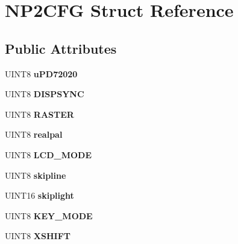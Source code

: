 \hypertarget{structNP2CFG}{\section{N\-P2\-C\-F\-G Struct Reference}
\label{structNP2CFG}
}
\subsection*{Public Attributes}
\begin{DoxyCompactItemize}
\item 
\hypertarget{structNP2CFG_afbc4660f716fc9b65a11ac7650f7a0f2}{U\-I\-N\-T8 {\bfseries u\-P\-D72020}}\label{structNP2CFG_afbc4660f716fc9b65a11ac7650f7a0f2}

\item 
\hypertarget{structNP2CFG_a37b2a0fa5e5775dc0e3ed127e1844c66}{U\-I\-N\-T8 {\bfseries D\-I\-S\-P\-S\-Y\-N\-C}}\label{structNP2CFG_a37b2a0fa5e5775dc0e3ed127e1844c66}

\item 
\hypertarget{structNP2CFG_a7633123ab7e14c1ff2b859aa9b92ce47}{U\-I\-N\-T8 {\bfseries R\-A\-S\-T\-E\-R}}\label{structNP2CFG_a7633123ab7e14c1ff2b859aa9b92ce47}

\item 
\hypertarget{structNP2CFG_aae2ceaeac33b5bed6f86b8de9e01f167}{U\-I\-N\-T8 {\bfseries realpal}}\label{structNP2CFG_aae2ceaeac33b5bed6f86b8de9e01f167}

\item 
\hypertarget{structNP2CFG_a3aac4d244e426320bb0688a49e750ebe}{U\-I\-N\-T8 {\bfseries L\-C\-D\-\_\-\-M\-O\-D\-E}}\label{structNP2CFG_a3aac4d244e426320bb0688a49e750ebe}

\item 
\hypertarget{structNP2CFG_af2d3df585466bcb8b6e2b4cfea0d4847}{U\-I\-N\-T8 {\bfseries skipline}}\label{structNP2CFG_af2d3df585466bcb8b6e2b4cfea0d4847}

\item 
\hypertarget{structNP2CFG_a2b2c188a36505b9f6364dd0047788469}{U\-I\-N\-T16 {\bfseries skiplight}}\label{structNP2CFG_a2b2c188a36505b9f6364dd0047788469}

\item 
\hypertarget{structNP2CFG_a8fb34dfc3f634912d2bd8664abaeeb7f}{U\-I\-N\-T8 {\bfseries K\-E\-Y\-\_\-\-M\-O\-D\-E}}\label{structNP2CFG_a8fb34dfc3f634912d2bd8664abaeeb7f}

\item 
\hypertarget{structNP2CFG_ac96dcb958d212595cd814ab9db2b94b3}{U\-I\-N\-T8 {\bfseries X\-S\-H\-I\-F\-T}}\label{structNP2CFG_ac96dcb958d212595cd814ab9db2b94b3}


\end{DoxyCompactItemize}
